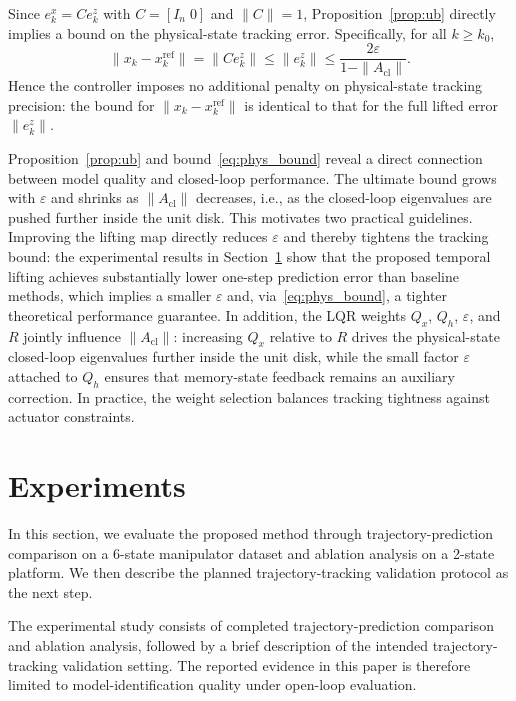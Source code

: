 \documentclass[journal]{IEEEtran}
\begin{document}
Since $e_k^x = Ce_k^z$ with $C=[I_n\;0]$ and $\|C\|=1$, Proposition~\ref{prop:ub} directly implies a bound on the physical-state tracking error. Specifically, for all $k \geq k_0$,
\begin{equation}
    \|x_k - x_k^{\mathrm{ref}}\| = \|C e_k^z\| \leq \|e_k^z\| \leq \frac{2\varepsilon}{1 - \|A_{\mathrm{cl}}\|}.
    \label{eq:phys_bound}
\end{equation}
Hence the controller imposes no additional penalty on physical-state tracking precision: the bound for $\|x_k - x_k^{\mathrm{ref}}\|$ is identical to that for the full lifted error $\|e_k^z\|$.

Proposition~\ref{prop:ub} and bound~\eqref{eq:phys_bound} reveal a direct connection between model quality and closed-loop performance. The ultimate bound grows with $\varepsilon$ and shrinks as $\|A_{\mathrm{cl}}\|$ decreases, i.e., as the closed-loop eigenvalues are pushed further inside the unit disk. This motivates two practical guidelines. Improving the lifting map directly reduces $\varepsilon$ and thereby tightens the tracking bound: the experimental results in Section~\ref{sec:experiments} show that the proposed temporal lifting achieves substantially lower one-step prediction error than baseline methods, which implies a smaller $\varepsilon$ and, via~\eqref{eq:phys_bound}, a tighter theoretical performance guarantee. In addition, the LQR weights $Q_x$, $Q_h$, $\varepsilon$, and $R$ jointly influence $\|A_{\mathrm{cl}}\|$: increasing $Q_x$ relative to $R$ drives the physical-state closed-loop eigenvalues further inside the unit disk, while the small factor $\varepsilon$ attached to $Q_h$ ensures that memory-state feedback remains an auxiliary correction. In practice, the weight selection balances tracking tightness against actuator constraints.

\section{Experiments}
\label{sec:experiments}

In this section, we evaluate the proposed method through trajectory-prediction comparison on a 6-state manipulator dataset and ablation analysis on a 2-state platform. We then describe the planned trajectory-tracking validation protocol as the next step.

The experimental study consists of completed trajectory-prediction comparison and ablation analysis, followed by a brief description of the intended trajectory-tracking validation setting. The reported evidence in this paper is therefore limited to model-identification quality under open-loop evaluation.
\end{document}
